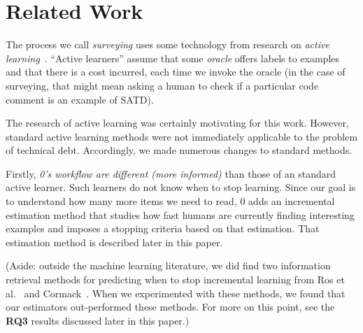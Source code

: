 \documentclass[10pt,conference]{IEEEtran}
\begin{document}
 \section{Related Work}
 The process we call {\em surveying} uses some technology from
 research on  {\em  active learning}~\cite{cormack2014evaluation,Abe:1998}. 
 ``Active learners'' assume that some {\em oracle} offers labels
 to examples and that there is a cost incurred, each time we
 invoke the oracle
 (in the case of surveying, that might mean asking a human to check if a particular code comment is an example of SATD).  
 
 The research of active learning was certainly motivating for this work.
 However, standard active learning methods were not immediately applicable
 to the problem of technical debt. Accordingly, we  made
 numerous changes to standard methods.
 

Firstly, 
 {\em {\IT}0's workflow are different (more informed)}
 than those of an standard active learner.
 Such learners do not   know when to stop learning. 
 Since our goal is to understand how many more items we need to read,
 {\IT}0   adds an  incremental estimation method
that studies how fast humans are currently finding interesting examples and imposes a stopping criteria based on that estimation.   That estimation method is described later in this paper.

(Aside: outside the machine learning literature,
we did find two information retrieval methods for predicting
when to stop incremental learning 
from 
Ros et al.~\cite{ros2017machine} and
Cormack~\cite{cormack2016engineering}. When we experimented
with these methods, we found that our estimators out-performed
these methods. For more on this point, see the {\bf RQ3} results
discussed later in this paper.)
\end{document}
